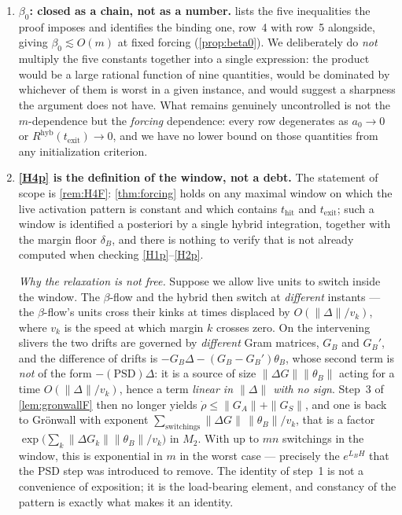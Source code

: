 \documentclass[11pt]{article}
\theoremstyle{definition}
\theoremstyle{remark}
\newcommand{\thit}{t_{\mathrm{hit}}}
\newcommand{\texit}{t_{\mathrm{exit}}}
\newcommand{\hyb}{\mathrm{hyb}}
\begin{document}
\begin{enumerate}
\item[(O1)] \textbf{$\beta_0$: closed as a chain, not as a number.}
 lists the five inequalities the proof imposes and identifies
the binding one, row~4 with row~5 alongside, giving $\beta_0\lesssim O(m)$ at
fixed forcing (\cref{prop:beta0}). We deliberately do \emph{not} multiply the
five constants together into a single expression: the product would be a large
rational function of nine quantities, would be dominated by whichever of them is
worst in a given instance, and would suggest a sharpness the argument does not
have. What remains genuinely uncontrolled is not the $m$-dependence but the
\emph{forcing} dependence: every row degenerates as $a_0\to0$ or
$R^{\hyb}(\texit)\to0$, and we have no lower bound on those quantities from any
initialization criterion.
\item[(O2)] \textbf{\eqref{H4p} is the definition of the window, not a debt.} The
statement of scope is \cref{rem:H4F}: \cref{thm:forcing} holds on any maximal
window on which the live activation pattern is constant and which contains
$\thit$ and $\texit$; such a window is identified a posteriori by a single
hybrid integration, together with the margin floor $\delta_B$, and there is
nothing to verify that is not already computed when checking \eqref{H1p}--\eqref{H2p}.

\emph{Why the relaxation is not free.} Suppose we allow live units to switch
inside the window. The $\beta$-flow and the hybrid then switch at
\emph{different} instants --- the $\beta$-flow's units cross their kinks at
times displaced by $O(\|\Delta\|/v_k)$, where $v_k$ is the speed at which margin
$k$ crosses zero. On the intervening slivers the two drifts are governed by
\emph{different} Gram matrices, $G_B$ and $G_B'$, and the difference of drifts
is $-G_B\Delta-(G_B-G_B')\theta_B$, whose second term is \emph{not} of the form
$-(\text{PSD})\Delta$: it is a source of size $\|\Delta G\|\|\theta_B\|$ acting
for a time $O(\|\Delta\|/v_k)$, hence a term \emph{linear in $\|\Delta\|$ with
no sign}. Step~3 of \cref{lem:gronwallF} then no longer yields
$\dot\rho\le\|G_A\|+\|G_S\|$, and one is back to Gr\"onwall with exponent
$\sum_{\text{switchings}}\|\Delta G\|\,\|\theta_B\|/v_k$, that is a factor
$\exp\bigl(\sum_k\|\Delta G_k\|\|\theta_B\|/v_k\bigr)$ in $M_2$. With up to $mn$
switchings in the window, this is exponential in $m$ in the worst case ---
precisely the $e^{L_BH}$ that the PSD step was introduced to remove. The
identity of step~1 is not a convenience of exposition; it is the load-bearing
element, and constancy of the pattern is exactly what makes it an identity.


\end{enumerate}
\end{document}
